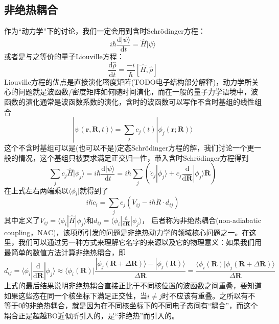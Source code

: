 \documentclass{article}
\numberwithin{equation}{section}
\begin{document}
      \subsection{非绝热耦合}
        作为“动力学”下的讨论，我们一定会用到含时Schr\"odinger方程：
        \begin{equation}
          i \hbar \frac{\mathrm{d} | \psi \rangle}{\mathrm{d} t}=\hat{H} | \psi \rangle
        \end{equation}
        或者是与之等价的量子Liouville方程：
        \begin{equation}
          \frac{\mathrm{d} \hat{\rho}}{\mathrm{d} t}=\frac{-i}{\hbar}[\hat{H}, \hat{\rho}]
        \end{equation}
        Liouville方程的优点是直接演化密度矩阵(TODO电子结构部分解释)，动力学所关心的问题就是波函数/密度矩阵如何随时间演化，而在一般的量子力学语境中，波函数的演化通常是波函数系数的演化，含时的波函数可以写作不含时基组的线性组合
        \begin{equation}
          |\psi(\mathbf{r}, \mathbf{R}, t)\rangle=\sum_{j} c_{j}(t) |\phi_{j}(\mathbf{r} ; \mathbf{R})\rangle
          \label{linear combination}
        \end{equation}
        这个不含时基组可以是(也可以不是)定态Schr\"odinger方程的解，我们讨论一个更一般的情况，这个基组只被要求满足正交归一性，带入含时Schr\"odinger方程得到
        \begin{equation}
          \sum_j c_j \hat{H}|\phi_j\rangle=i \hbar \frac{\mathrm{d} | \psi \rangle}{\mathrm{d} t}=i \hbar\sum_j\left(\dot{c}_j|\phi_j\rangle+c_j\frac{\mathrm{d}}{\mathrm{d}\mathbf{R}}|\phi_j\rangle\dot{\mathbf{R}}\right)
        \end{equation}
        在上式左右两端乘以$\langle\phi_i|$就得到了
        \begin{equation}
          i \hbar \dot{c}_{i}=\sum_{j} c_{j}\left(V_{i j}-i \hbar \dot{R} \cdot d_{i j}\right)
          \label{time-depend-coeff}
        \end{equation}
        其中定义了$V_{ij}=\langle\phi_i|\hat{H}|\phi_j\rangle$和$d_{ij}=\langle\phi_i|\frac{\mathrm{d}}{\mathrm{d}\mathbf{R}}|\phi_j\rangle$，
        后者称为非绝热耦合(non-adiabatic coupling，NAC)，该项所引发的问题是非绝热动力学的领域核心问题之一。在这里，我们可以通过另一种方式来理解它名字的来源以及它的物理意义：如果我们用最简单的数值方法计算非绝热耦合，即
        \begin{equation}
          d_{ij}=\langle\phi_i|\frac{\mathrm{d}}{\mathrm{d}\mathbf{R}}|\phi_j\rangle\approx\langle\phi_i(\mathbf{R})|\frac{|\phi_j(\mathbf{R}+\Delta\mathbf{R})\rangle-|\phi_j(\mathbf{R})\rangle}{\Delta\mathbf{R}}
          =\frac{\langle\phi_i(\mathbf{R})|\phi_j(\mathbf{R}+\Delta\mathbf{R})\rangle}{\Delta\mathbf{R}}
          \label{numerical dij}
        \end{equation}
        上式的最后结果说明非绝热耦合直接正比于不同核位置的波函数之间重叠，要知道如果这些态在同一个核坐标下满足正交性，当$i\neq j$时不应该有重叠。之所以有不等于0的非绝热耦合，就是因为在不同核坐标下的不同电子态间有“耦合”，而这个耦合正是超越BO近似所引入的，是“非绝热”而引入的。
\end{document}
